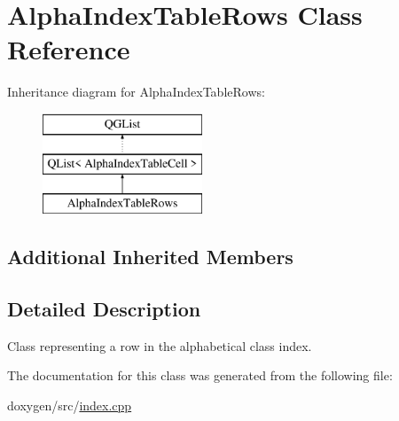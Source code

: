 \hypertarget{class_alpha_index_table_rows}{}\section{Alpha\+Index\+Table\+Rows Class Reference}
\label{class_alpha_index_table_rows}
Inheritance diagram for Alpha\+Index\+Table\+Rows\+:\begin{figure}[H]
\begin{center}
\leavevmode
\includegraphics[height=3.000000cm]{class_alpha_index_table_rows}
\end{center}
\end{figure}
\subsection*{Additional Inherited Members}


\subsection{Detailed Description}
Class representing a row in the alphabetical class index. 

The documentation for this class was generated from the following file\+:\begin{DoxyCompactItemize}
\item 
doxygen/src/\mbox{\hyperlink{index_8cpp}{index.\+cpp}}\end{DoxyCompactItemize}
